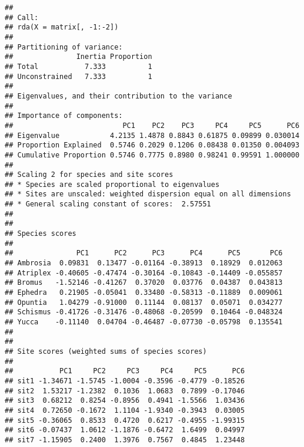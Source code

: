 \documentclass[
]{article}
\begin{document}
\begin{verbatim}
## 
## Call:
## rda(X = matrix[, -1:-2]) 
## 
## Partitioning of variance:
##               Inertia Proportion
## Total           7.333          1
## Unconstrained   7.333          1
## 
## Eigenvalues, and their contribution to the variance 
## 
## Importance of components:
##                          PC1    PC2    PC3     PC4     PC5      PC6
## Eigenvalue            4.2135 1.4878 0.8843 0.61875 0.09899 0.030014
## Proportion Explained  0.5746 0.2029 0.1206 0.08438 0.01350 0.004093
## Cumulative Proportion 0.5746 0.7775 0.8980 0.98241 0.99591 1.000000
## 
## Scaling 2 for species and site scores
## * Species are scaled proportional to eigenvalues
## * Sites are unscaled: weighted dispersion equal on all dimensions
## * General scaling constant of scores:  2.57551 
## 
## 
## Species scores
## 
##               PC1      PC2      PC3      PC4      PC5       PC6
## Ambrosia  0.09831  0.13477 -0.01164 -0.38913  0.18929  0.012063
## Atriplex -0.40605 -0.47474 -0.30164 -0.10843 -0.14409 -0.055857
## Bromus   -1.52146 -0.41267  0.37020  0.03776  0.04387  0.043813
## Ephedra   0.21905 -0.05041  0.33480 -0.58313 -0.11889  0.009061
## Opuntia   1.04279 -0.91000  0.11144  0.08137  0.05071  0.034277
## Schismus -0.41726 -0.31476 -0.48068 -0.20599  0.10464 -0.048324
## Yucca    -0.11140  0.04704 -0.46487 -0.07730 -0.05798  0.135541
## 
## 
## Site scores (weighted sums of species scores)
## 
##           PC1     PC2     PC3     PC4     PC5      PC6
## sit1 -1.34671 -1.5745 -1.0004 -0.3596 -0.4779 -0.18526
## sit2  1.53217 -1.2382  0.1036  1.0683  0.7899 -0.17046
## sit3  0.68212  0.8254 -0.8956  0.4941 -1.5566  1.03436
## sit4  0.72650 -0.1672  1.1104 -1.9340 -0.3943  0.03005
## sit5 -0.36065  0.8533  0.4720  0.6217 -0.4955 -1.99315
## sit6 -0.07437  1.0612 -1.1876 -0.6472  1.6499  0.04997
## sit7 -1.15905  0.2400  1.3976  0.7567  0.4845  1.23448
\end{verbatim}
\end{document}
